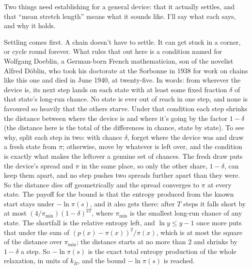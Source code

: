 \documentclass[11pt,twoside]{article}
\theoremstyle{thielethm}
\theoremstyle{thieledef}
\theoremstyle{thieledef}
\theoremstyle{thieledef}
\theoremstyle{thielethm}
\theoremstyle{thieleobs}
\theoremstyle{thielethm}
\begin{document}
Two things need establishing for a general device: that it actually settles, and that
``mean stretch length'' means what it sounds like. I'll say what each says, and why it holds.

Settling comes first. A chain doesn't have to settle. It can get stuck in a corner, or cycle round
forever. What rules that out here is a condition named for Wolfgang Doeblin, a German-born French
mathematician, son of the novelist Alfred Döblin, who took his doctorate at the Sorbonne in 1938
for work on chains like this one and died in June 1940, at twenty-five. In words: from wherever
the device is, its next step lands on each state with at least some fixed fraction $\delta$ of
that state's long-run chance. No state is ever out of reach in one step, and none is favoured
so heavily that the others starve. Under that condition each step shrinks the distance between
where the device is and where it's going by the factor $1-\delta$ (the distance here is the total
of the differences in chance, state by state). To see why, split each step in two: with chance
$\delta$, forget where the device was and draw a fresh state from $\pi$; otherwise, move by
whatever is left over, and the condition is exactly what makes the leftover a genuine set of
chances. The fresh draw puts the device's spread and $\pi$ in the same place, so only the other
share, $1-\delta$, can keep them apart, and no step pushes two spreads further apart than they
were. So the distance dies off geometrically and the spread converges to $\pi$ at every state.
The payoff for the bound is that the entropy produced from the known start stays under
$-\ln\pi(s)$, and it also gets there: after $T$ steps it falls short by at most
$(4/\pi_{\min})(1-\delta)^{2T}$, where $\pi_{\min}$ is the smallest long-run chance of any state.
The shortfall is the relative entropy left, and $\ln y \le y - 1$ once more puts that under the
sum of $(p(x)-\pi(x))^2/\pi(x)$, which is at most the square of the distance over $\pi_{\min}$;
the distance starts at no more than $2$ and shrinks by $1-\delta$ a step. So $-\ln\pi(s)$ is the
exact total entropy production of the whole relaxation, in units of $k_B$, and the
bound $-\ln\pi(s)$ is reached.
\end{document}
